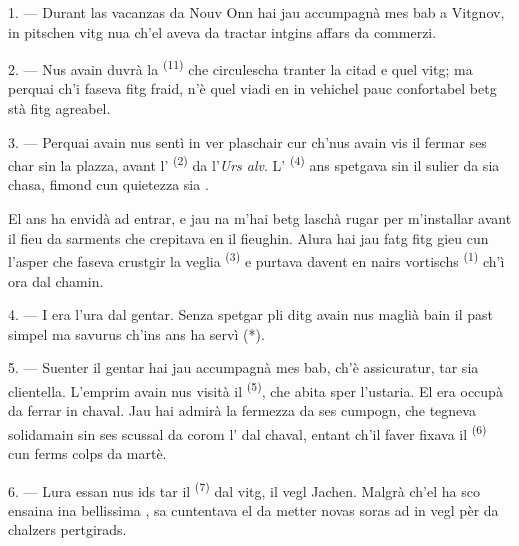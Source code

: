 \VUsaut{3.0mm}

\VUsaut{4.0mm}

1. --- Durant las vacanzas da Nouv Onn hai jau accumpagnà mes bab a Vitgnov, in
pitschen vitg nua ch'el aveva da tractar intgins affars da commerzi.

2. --- Nus avain duvrà la  \textsuperscript{(11)} che circulescha
tranter la citad e quel vitg; ma perquai ch'i faseva fitg fraid, n'è quel
viadi en in vehichel pauc confortabel betg stà fitg agreabel.

3. --- Perquai avain nus sentì in ver plaschair cur ch'nus avain vis il
 fermar ses char sin la plazza, avant l'
\textsuperscript{(2)} da l'\textit{Urs alv}. L' \textsuperscript{(4)} ans
spetgava sin il sulier da sia chasa, fimond cun quietezza sia .

El ans ha envidà ad entrar, e jau na m'hai betg laschà rugar per m'installar avant
il fieu da sarments che crepitava en il fieughin. Alura hai jau fatg fitg gieu cun
l'asper  che faseva crustgir la veglia 
\textsuperscript{(3)} e purtava davent en nairs vortischs 
\textsuperscript{(1)} ch'ì ora dal chamin.

4. --- I era l'ura dal gentar. Senza spetgar pli ditg avain nus maglià bain il past
simpel ma savurus ch'ins ans ha servì (*).

\VUsaut{3.0mm}

5. --- Suenter il gentar hai jau accumpagnà mes bab, ch'è assicuratur, tar sia
clientella. L'emprim avain nus visità il  \textsuperscript{(5)}, che
abita sper l'ustaria. El era occupà da ferrar in chaval. Jau hai admirà la fermezza
da ses cumpogn, che tegneva solidamain sin ses scussal da corom l' dal
chaval, entant ch'il faver fixava il  \textsuperscript{(6)} cun ferms
colps da martè.

6. --- Lura essan nus ids tar il  \textsuperscript{(7)} dal vitg, il
vegl Jachen. Malgrà ch'el ha sco ensaina ina bellissima , sa
cuntentava el da metter novas soras ad in vegl pèr da chalzers pertgirads.

